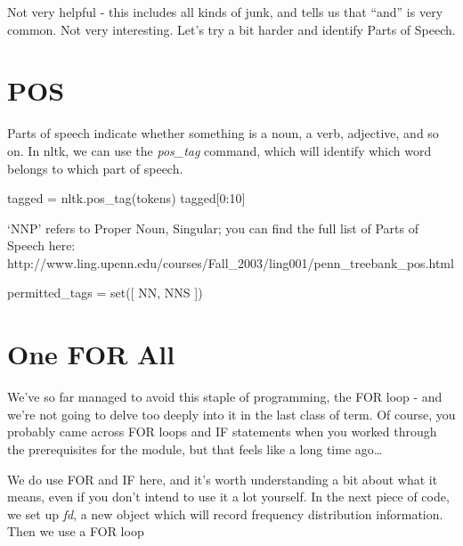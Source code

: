 \documentclass[
  letterpaper,
  DIV=11,
  numbers=noendperiod]{scrreprt}
\newenvironment{Shaded}{\begin{snugshade}}{\end{snugshade}}
\newcommand{\BuiltInTok}[1]{\textcolor[rgb]{0.00,0.23,0.31}{#1}}
\newcommand{\DecValTok}[1]{\textcolor[rgb]{0.68,0.00,0.00}{#1}}
\newcommand{\NormalTok}[1]{\textcolor[rgb]{0.00,0.23,0.31}{#1}}
\newcommand{\OperatorTok}[1]{\textcolor[rgb]{0.37,0.37,0.37}{#1}}
\newcommand{\StringTok}[1]{\textcolor[rgb]{0.13,0.47,0.30}{#1}}
\begin{document}
Not very helpful - this includes all kinds of junk, and tells us that
``and'' is very common. Not very interesting. Let's try a bit harder and
identify Parts of Speech.

\hypertarget{pos}{%
\section{POS}\label{pos}}

Parts of speech indicate whether something is a noun, a verb, adjective,
and so on. In nltk, we can use the \emph{pos\_tag} command, which will
identify which word belongs to which part of speech.

\begin{Shaded}
\begin{Highlighting}[]
\NormalTok{tagged }\OperatorTok{=}\NormalTok{ nltk.pos\_tag(tokens)}
\NormalTok{tagged[}\DecValTok{0}\NormalTok{:}\DecValTok{10}\NormalTok{]}
\end{Highlighting}
\end{Shaded}

`NNP' refers to Proper Noun, Singular; you can find the full list of
Parts of Speech here:
http://www.ling.upenn.edu/courses/Fall\_2003/ling001/penn\_treebank\_pos.html

\begin{Shaded}
\begin{Highlighting}[]
\NormalTok{permitted\_tags }\OperatorTok{=} \BuiltInTok{set}\NormalTok{([}
    \StringTok{\textquotesingle{}NN\textquotesingle{}}\NormalTok{,}
    \StringTok{\textquotesingle{}NNS\textquotesingle{}}
\NormalTok{])}
\end{Highlighting}
\end{Shaded}

\hypertarget{one-for-all}{%
\section{One FOR All}\label{one-for-all}}

We've so far managed to avoid this staple of programming, the FOR loop -
and we're not going to delve too deeply into it in the last class of
term. Of course, you probably came across FOR loops and IF statements
when you worked through the prerequisites for the module, but that feels
like a long time ago\ldots{}

We do use FOR and IF here, and it's worth understanding a bit about what
it means, even if you don't intend to use it a lot yourself. In the next
piece of code, we set up \emph{fd}, a new object which will record
frequency distribution information. Then we use a FOR loop
\end{document}
